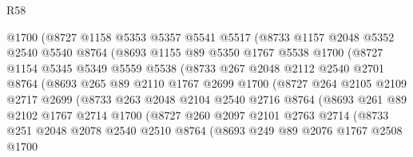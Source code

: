 \begin{lexlean}{R58}
\begin{coremodule}
              @1700
              (@8727
                @1158
                @5353
                @5357
                @5541
                @5517
                (@8733
                  @1157
                  @2048
                  @5352
                  @2540
                  @5540
                  @8764
                  (@8693
                    @1155
                    @89
                    @5350
                    @1767
                    @5538
                    @1700
                    (@8727
                      @1154
                      @5345
                      @5349
                      @5559
                      @5538
                      (@8733
                        @267
                        @2048
                        @2112
                        @2540
                        @2701
                        @8764
                        (@8693
                          @265
                          @89
                          @2110
                          @1767
                          @2699
                          @1700
                          (@8727
                            @264
                            @2105
                            @2109
                            @2717
                            @2699
                            (@8733
                              @263
                              @2048
                              @2104
                              @2540
                              @2716
                              @8764
                              (@8693
                                @261
                                @89
                                @2102
                                @1767
                                @2714
                                @1700
                                (@8727
                                  @260
                                  @2097
                                  @2101
                                  @2763
                                  @2714
                                  (@8733
                                    @251
                                    @2048
                                    @2078
                                    @2540
                                    @2510
                                    @8764
                                    (@8693
                                      @249
                                      @89
                                      @2076
                                      @1767
                                      @2508
                                      @1700

\end{coremodule}
\end{lexlean}
